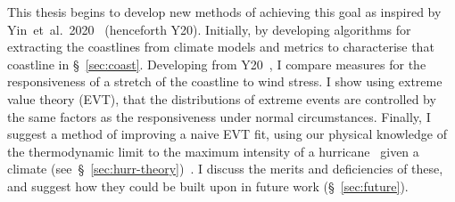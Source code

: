 This thesis begins to develop new methods of achieving this goal
as inspired by Yin~et~al.~2020~\cite{ZannaPreprint} (henceforth Y20).
Initially, by developing algorithms for extracting the coastlines from climate models
and metrics to characterise that coastline in §~\ref{sec:coast}.
Developing from Y20~\cite{ZannaPreprint}, I compare measures for the
responsiveness of a stretch of the coastline to wind stress.
I show using extreme value theory (EVT), that the
distributions of extreme events are controlled by the same factors as
the responsiveness under normal circumstances.
Finally, I suggest a
method of improving a naive EVT fit, using our physical knowledge
of the thermodynamic limit
to the maximum intensity of a hurricane~\cite{emanuel1999thermodynamic}
 given a climate (see~§~\ref{sec:hurr-theory})~\cite{emanuel1987dependence,
 emanuel2016predictability}.
I discuss the merits and deficiencies of these,
and suggest how they could be built upon in future work (§~\ref{sec:future}).
